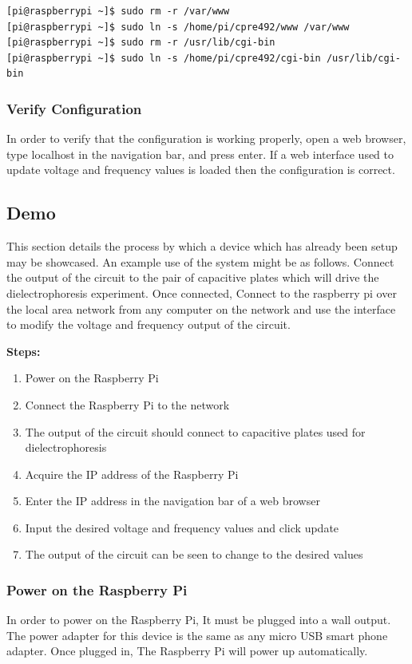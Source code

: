 \documentclass{article}	%
\begin{document}
\begin{multicols}{2}
\begin{lstlisting}
[pi@raspberrypi ~]$ sudo rm -r /var/www
[pi@raspberrypi ~]$ sudo ln -s /home/pi/cpre492/www /var/www 
[pi@raspberrypi ~]$ sudo rm -r /usr/lib/cgi-bin
[pi@raspberrypi ~]$ sudo ln -s /home/pi/cpre492/cgi-bin /usr/lib/cgi-bin 
\end{lstlisting}

\subsubsection{Verify Configuration}
In order to verify that the configuration
is working properly,
open a web browser,
type localhost in the navigation bar, and
press enter.
If a web interface used to update
voltage and frequency values is loaded then
the configuration is correct.

\subsection{Demo}
This section details the process
by which a device which has already
been setup may be showcased.
An example use of the system might be as follows.
Connect the output of the circuit to the pair
of capacitive plates which will drive 
the dielectrophoresis experiment.
Once connected,
Connect to the raspberry pi over
the local area network from
any computer on the network and
use the interface to modify the
voltage and frequency output of the circuit.

\textbf{Steps:}
\begin{enumerate}
\item{Power on the Raspberry Pi}
\item{Connect the Raspberry Pi to the network}
\item{The output of the circuit should connect to capacitive plates used for dielectrophoresis}
\item{Acquire the IP address of the Raspberry Pi}
\item{Enter the IP address in the navigation bar of a web browser}
\item{Input the desired voltage and frequency values and click update}
\item{The output of the circuit can be seen to change to the desired values}
\end{enumerate}

\subsubsection{Power on the Raspberry Pi}
In order to power on the Raspberry Pi,
It must be plugged into a wall output.
The power adapter for this device is
the same as any micro USB smart phone adapter.
Once plugged in,
The Raspberry Pi will power up automatically.


\end{multicols}
\end{document}
